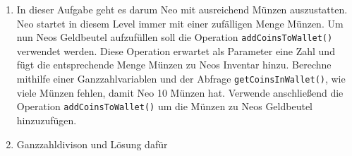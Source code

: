 
\begin{enumerate}
    \item In dieser Aufgabe geht es darum Neo mit ausreichend Münzen auszustatten.
        Neo startet in diesem Level immer mit einer zufälligen Menge Münzen.
        Um nun Neos Geldbeutel aufzufüllen soll die Operation \lstinline|addCoinsToWallet()| verwendet werden.
        Diese Operation erwartet als Parameter eine Zahl und fügt die entsprechende Menge Münzen zu Neos Inventar hinzu.
        Berechne mithilfe einer Ganzzahlvariablen und der Abfrage \lstinline|getCoinsInWallet()|, wie viele Münzen fehlen, damit Neo 10 Münzen hat.
        Verwende anschließend die Operation \lstinline|addCoinsToWallet()| um die Münzen zu Neos Geldbeutel hinzuzufügen.

    \item Ganzzahldivison und Lösung dafür
\end{enumerate}

